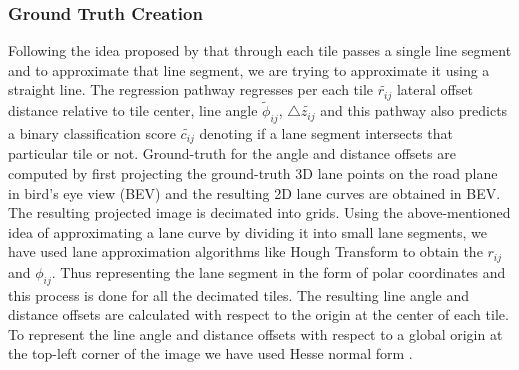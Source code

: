         \subsubsection{Ground Truth Creation}
        Following the idea proposed by \cite{DBLP:journals/corr/abs-2011-01535} that through each tile passes a single line segment and to approximate that line segment, we are trying to approximate it using a straight line. The regression pathway regresses per each tile $\widetilde{r_{ij}}$ lateral offset distance relative to tile center, line angle $\widetilde{\phi}_{ij}$, $\triangle{\widetilde{z_{ij}}}$ and this pathway also predicts a binary classification score $\widetilde{c_{ij}}$ denoting if a lane segment intersects that particular tile or not. 
        Ground-truth for the angle and distance offsets are computed by first projecting the ground-truth 3D lane points on the road plane in bird's eye view (BEV) and the resulting 2D lane curves are obtained in BEV. The resulting projected image is decimated into grids. Using the above-mentioned idea of approximating a lane curve by dividing it into small lane segments, we have used lane approximation algorithms like Hough Transform to obtain the $r_{ij}$ and $\phi_{ij}$. Thus representing the lane segment in the form of polar coordinates and this process is done for all the decimated tiles. The resulting line angle and distance offsets are calculated with respect to the origin at the center of each tile. To represent the line angle and distance offsets with respect to a global origin at the top-left corner of the image we have used Hesse normal form . 
        
